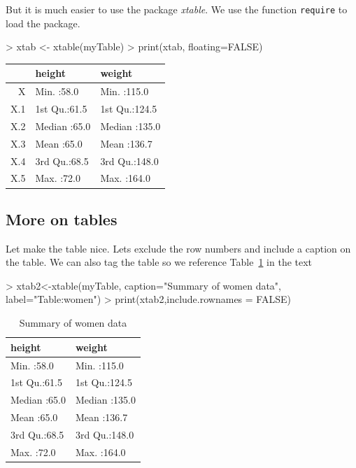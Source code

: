 \documentclass{article}
\newcommand{\Rfunction}[1]{{\texttt{#1}}}
\newcommand{\Rpackage}[1]{\textit{#1}}
\begin{document}
But it is much easier to use the package \Rpackage{xtable}. We use the function \Rfunction{require} to load the package.

\begin{Schunk}
\begin{Sinput}
> xtab <- xtable(myTable)
> print(xtab, floating=FALSE)
\end{Sinput}
\begin{tabular}{rll}
  \hline
 &     height &     weight \\ 
  \hline
X & Min.   :58.0   & Min.   :115.0   \\ 
  X.1 & 1st Qu.:61.5   & 1st Qu.:124.5   \\ 
  X.2 & Median :65.0   & Median :135.0   \\ 
  X.3 & Mean   :65.0   & Mean   :136.7   \\ 
  X.4 & 3rd Qu.:68.5   & 3rd Qu.:148.0   \\ 
  X.5 & Max.   :72.0   & Max.   :164.0   \\ 
   \hline
\end{tabular}\end{Schunk}


\subsection{More on tables}

Let make the table nice.  Lets exclude the row numbers and include a caption on the table. We can also tag the table so we reference Table~\ref{Table:women} in the text


\begin{Schunk}
\begin{Sinput}
> xtab2<-xtable(myTable, caption="Summary of women data",  label="Table:women")
> print(xtab2,include.rownames = FALSE)
\end{Sinput}
\begin{table}[ht]
\centering
\begin{tabular}{ll}
  \hline
    height &     weight \\ 
  \hline
Min.   :58.0   & Min.   :115.0   \\ 
  1st Qu.:61.5   & 1st Qu.:124.5   \\ 
  Median :65.0   & Median :135.0   \\ 
  Mean   :65.0   & Mean   :136.7   \\ 
  3rd Qu.:68.5   & 3rd Qu.:148.0   \\ 
  Max.   :72.0   & Max.   :164.0   \\ 
   \hline
\end{tabular}
\caption{Summary of women data} 
\label{Table:women}
\end{table}\end{Schunk}
\end{document}
